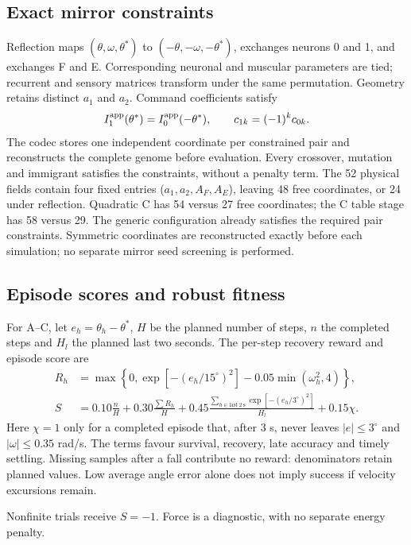 \documentclass{styles/svproc}
\begin{document}
\subsection{Exact mirror constraints}
Reflection maps $(\theta,\omega,\theta^*)$ to $(-\theta,-\omega,-\theta^*)$, exchanges neurons 0 and 1, and exchanges F and E. Corresponding neuronal and muscular parameters are tied; recurrent and sensory matrices transform under the same permutation. Geometry retains distinct $a_1$ and $a_2$. Command coefficients satisfy
\begin{equation}
 I_1^{\rm app}(\theta^*)=I_0^{\rm app}(-\theta^*),\qquad
 c_{1k}=(-1)^kc_{0k}.
 \label{eq:mirror}
\end{equation}
The codec stores one independent coordinate per constrained pair and reconstructs the complete genome before evaluation. Every crossover, mutation and immigrant satisfies the constraints, without a penalty term. The 52 physical fields contain four fixed entries ($a_1,a_2,A_F,A_E$), leaving 48 free coordinates, or 24 under reflection. Quadratic C has 54 versus 27 free coordinates; the C table stage has 58 versus 29. The generic configuration already satisfies the required pair constraints. Symmetric coordinates are reconstructed exactly before each simulation; no separate mirror seed screening is performed.

\subsection{Episode scores and robust fitness}
For A--C, let $e_h=\theta_h-\theta^*$, $H$ be the planned number of steps, $n$ the completed steps and $H_l$ the planned last two seconds. The per-step recovery reward and episode score are
\begin{align}
 R_h&=\max\!\left\{0,\exp[-(e_h/15^\circ)^2]-0.05\min(\omega_h^2,4)\right\},\nonumber\\
 S&=0.10\frac nH+0.30\frac{\sum R_h}{H}
       +0.45\frac{\sum_{h\in\mathrm{last\ 2\ s}}\exp[-(e_h/3^\circ)^2]}{H_l}
       +0.15\chi.
 \label{eq:staticfitness}
\end{align}
Here $\chi=1$ only for a completed episode that, after 3 s, never leaves $|e|\le3^\circ$ and $|\omega|\le0.35$ rad/s. The terms favour survival, recovery, late accuracy and timely settling. Missing samples after a fall contribute no reward: denominators retain planned values. Low average angle error alone does not imply success if velocity excursions remain.

Nonfinite trials receive $S=-1$. Force is a diagnostic, with no separate energy penalty.
\end{document}
